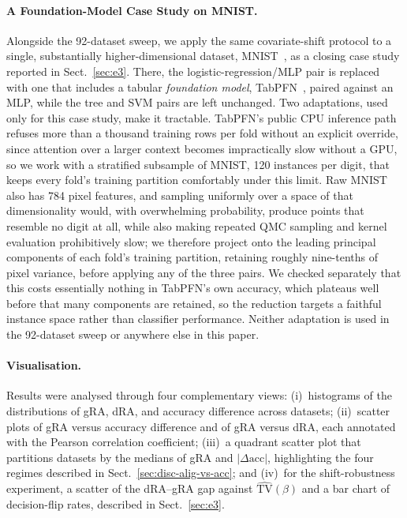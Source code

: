 \documentclass[runningheads]{llncs}
\begin{document}
\paragraph{A Foundation-Model Case Study on MNIST.}
\label{sec:mnist-protocol}
Alongside the 92-dataset sweep, we apply the same covariate-shift protocol to a single, substantially higher-dimensional dataset, MNIST~\cite{lecun1998mnist}, as a closing case study reported in Sect.~\ref{sec:e3}. There, the logistic-regression/MLP pair is replaced with one that includes a tabular \emph{foundation model}, TabPFN~\cite{Hollmann2025Nature}, paired against an MLP, while the tree and SVM pairs are left unchanged. Two adaptations, used only for this case study, make it tractable. TabPFN's public CPU inference path refuses more than a thousand training rows per fold without an explicit override, since attention over a larger context becomes impractically slow without a GPU, so we work with a stratified subsample of MNIST, 120 instances per digit, that keeps every fold's training partition comfortably under this limit. Raw MNIST also has 784 pixel features, and sampling uniformly over a space of that dimensionality would, with overwhelming probability, produce points that resemble no digit at all, while also making repeated QMC sampling and kernel evaluation prohibitively slow; we therefore project onto the leading principal components of each fold's training partition, retaining roughly nine-tenths of pixel variance, before applying any of the three pairs. We checked separately that this costs essentially nothing in TabPFN's own accuracy, which plateaus well before that many components are retained, so the reduction targets a faithful instance space rather than classifier performance. Neither adaptation is used in the 92-dataset sweep or anywhere else in this paper.

\paragraph{Visualisation.}
Results were analysed through four complementary views: (i)~histograms of the
distributions of gRA, dRA, and accuracy difference across datasets; (ii)~scatter plots of
gRA versus accuracy difference and of gRA versus dRA, each annotated with the
Pearson correlation coefficient; (iii)~a quadrant scatter plot that partitions datasets
by the medians of gRA and $|\Delta\text{acc}|$, highlighting the four regimes described in Sect.~\ref{sec:disc-alig-vs-acc}; and (iv)~for the shift-robustness experiment, a scatter of the dRA--gRA gap against $\widehat{\mathrm{TV}}(\beta)$ and a bar chart of decision-flip rates, described in Sect.~\ref{sec:e3}.
\end{document}
